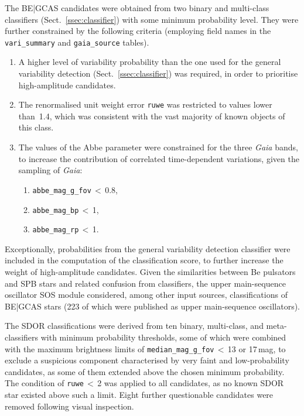 \documentclass[longauth]{aa}
\def\gaia{\textit{Gaia}\xspace}
\def\gdr3{\textit{Gaia}~DR3\xspace}
\begin{document}
The BE|GCAS candidates were obtained from two binary and multi-class classifiers (Sect.~\ref{ssec:classifier}) with some minimum probability level. They were further constrained by the following criteria (employing field names in the \texttt{vari\_summary} and \texttt{gaia\_source} tables).
\begin{enumerate}
    \item A higher level of variability probability than the one used for the general variability detection (Sect.~\ref{ssec:classifier}) was required, in order to prioritise high-amplitude candidates. 
    \item The renormalised unit weight error \texttt{ruwe} was restricted to values lower than~1.4, which was consistent with the vast majority of known objects of this class.
    \item The values of the Abbe parameter were constrained for the three \gaia bands, to increase the contribution of correlated time-dependent variations, given the sampling of \gaia: 
    \begin{enumerate}
        \item \texttt{abbe\_mag\_g\_fov}\,$<$\,0.8,
        \item \texttt{abbe\_mag\_bp}\,$<$\,1,
        \item \texttt{abbe\_mag\_rp}\,$<$\,1.
    \end{enumerate}
\end{enumerate}
Exceptionally, probabilities from the general variability detection classifier were included in the computation of the classification score, to further increase the weight of high-amplitude candidates.
Given the similarities between Be pulsators and SPB stars and related confusion from classifiers, the upper main-sequence oscillator SOS module \citep[see sect.~10.14 of the \gdr3 documentation;][]{2022gdr3.reptE..10R} considered, among other input sources, classifications of BE|GCAS stars (223 of which were published as upper main-sequence oscillators). 

The SDOR classifications were derived from ten binary, multi-class, and meta-classifiers with minimum probability thresholds, some of which were combined with the maximum brightness limits of  \texttt{median\_mag\_g\_fov}\,$<$\,13 or 17\,mag, to exclude a suspicious component characterised by very faint and low-probability candidates, as some of them extended above the chosen minimum probability. The condition of \texttt{ruwe}\,$<$\,2 was applied to all candidates, as no known SDOR star existed above such a limit. Eight further questionable candidates were removed following visual inspection.
\end{document}
